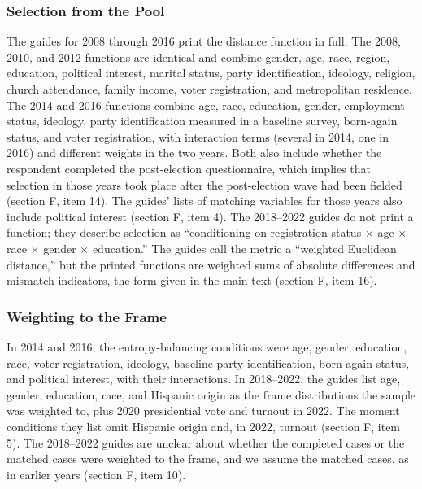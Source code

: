\documentclass[12pt]{article}
\begin{document}
\subsubsection*{Selection from the Pool}
The guides for 2008 through 2016 print the distance function in full. The 2008, 2010, and 2012 functions are identical and combine gender, age, race, region, education, political interest, marital status, party identification, ideology, religion, church attendance, family income, voter registration, and metropolitan residence. The 2014 and 2016 functions combine age, race, education, gender, employment status, ideology, party identification measured in a baseline survey, born-again status, and voter registration, with interaction terms (several in 2014, one in 2016) and different weights in the two years. Both also include whether the respondent completed the post-election questionnaire, which implies that selection in those years took place after the post-election wave had been fielded (section F, item 14). The guides' lists of matching variables for those years also include political interest (section F, item 4). The 2018--2022 guides do not print a function; they describe selection as ``conditioning on registration status $\times$ age $\times$ race $\times$ gender $\times$ education.'' The guides call the metric a ``weighted Euclidean distance,'' but the printed functions are weighted sums of absolute differences and mismatch indicators, the form given in the main text (section F, item 16).

\subsubsection*{Weighting to the Frame}
In 2014 and 2016, the entropy-balancing conditions were age, gender, education, race, voter registration, ideology, baseline party identification, born-again status, and political interest, with their interactions. In 2018--2022, the guides list age, gender, education, race, and Hispanic origin as the frame distributions the sample was weighted to, plus 2020 presidential vote and turnout in 2022. The moment conditions they list omit Hispanic origin and, in 2022, turnout (section F, item 5). The 2018--2022 guides are unclear about whether the completed cases or the matched cases were weighted to the frame, and we assume the matched cases, as in earlier years (section F, item 10).
\end{document}
